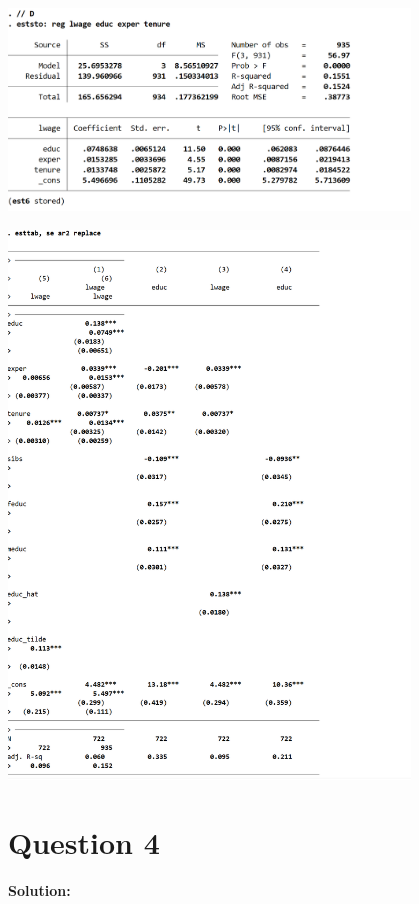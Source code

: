 \documentclass[12pt, oneside]{article}
\begin{document}
\begin{center}

    \includegraphics[width=0.8\textwidth]{Figure/P3.7.jpg}

    \includegraphics[width=0.8\textwidth]{Figure/P3.8.jpg}

\end{center}

\section{Question 4}
\textbf{Solution:}
\end{document}
